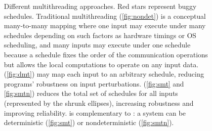 \begin{figure}[t]
\begin{center}
\vspace{-.05in}
\caption{Different multithreading approaches. Red stars represent buggy
schedules.  Traditional multithreading (\ref{fig:nondet}) is a conceptual
many-to-many mapping where one input may execute under many schedules depending
on such factors as hardware timings or OS scheduling, and many inputs may
execute under one schedule because a schedule fixes the order of the
communication operations but allows the local computations to operate on any
input data.  \dmt (\ref{fig:dmt}) may map each input to an arbitrary
schedule, reducing programs' robustness on input perturbations.  \smt
(\ref{fig:smt} and \ref{fig:smtn}) reduces the total set of schedules
for all inputs (represented by the shrunk ellipses), increasing robustness and
improving reliability. \smt is complementary to \dmt: a \smt system can be
deterministic (\ref{fig:smt}) or nondeterministic (\ref{fig:smtn}).}
\vspace{-.2in}
\end{center}
\end{figure}

